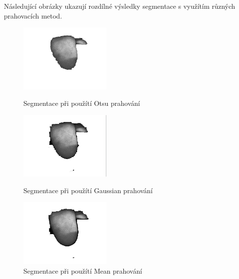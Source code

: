 Následující obrázky ukazují rozdílné výsledky segmentace s využítím různých prahovacích metod.
\begin{figure}[!htbp]
  \begin{minipage}[b]{0.3\linewidth}
    \centering
    \includegraphics[width=170px]{obrazky-figures/Images14otsu.png}
    \caption{Segmentace při použítí Otsu prahování}
  \end{minipage}
  \hspace{0.3cm}
  \begin{minipage}[b]{0.3\linewidth}
    \centering
    \includegraphics[width=170px]{obrazky-figures/Images14gauss.png}
    \caption{Segmentace při použítí Gaussian prahování}
  \end{minipage}
  \hspace{0.3cm}
    \begin{minipage}[b]{0.3\linewidth}
    \centering
    \includegraphics[width=170px]{obrazky-figures/Images14mean.png}
    \caption{Segmentace při použítí Mean prahování}
  \end{minipage}
\end{figure}


